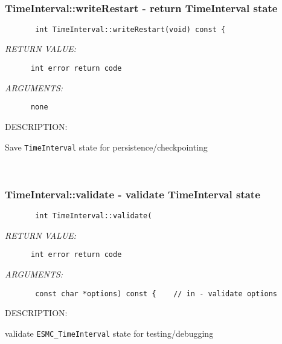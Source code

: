  
\mbox{}\hrulefill\ 
 
\subsubsection [TimeInterval::writeRestart] {TimeInterval::writeRestart - return TimeInterval state}


  
\begin{verbatim}       int TimeInterval::writeRestart(void) const {\end{verbatim}{\em RETURN VALUE:}
\begin{verbatim}      int error return code\end{verbatim}{\em ARGUMENTS:}
\begin{verbatim}      none\end{verbatim}
{\sf DESCRIPTION:\\ }


        Save {\tt TimeInterval} state for persistence/checkpointing
   
 
\mbox{}\hrulefill\ 
 
\subsubsection [TimeInterval::validate] {TimeInterval::validate - validate TimeInterval state}


  
\begin{verbatim}       int TimeInterval::validate(\end{verbatim}{\em RETURN VALUE:}
\begin{verbatim}      int error return code\end{verbatim}{\em ARGUMENTS:}
\begin{verbatim}       const char *options) const {    // in - validate options\end{verbatim}
{\sf DESCRIPTION:\\ }


        validate {\tt ESMC\_TimeInterval} state for testing/debugging
   
 
\mbox{}\hrulefill\ 
 
